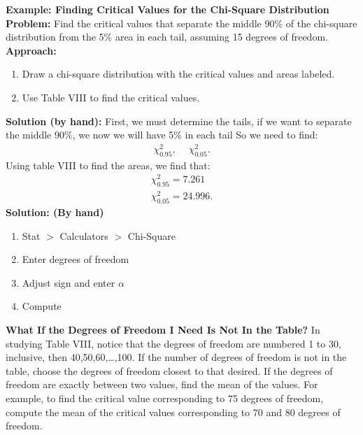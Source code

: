 \documentclass{report}
\begin{document}
    \pagebreak \bigbreak \noindent 
    \begin{mdframed}
      \textbf{Example: Finding Critical Values for the Chi-Square Distribution}
      \bigbreak \noindent 
      \textbf{Problem:}
      Find the critical values that separate the middle 90\% of the chi-square distribution from the 5\% area in each tail, assuming 15 degrees of freedom.
      \bigbreak \noindent 
      \textbf{Approach:}
      \begin{enumerate}
          \item Draw a chi-square distribution with the critical values and areas labeled.
            \item  Use Table VIII to find the critical values.
      \end{enumerate}
      \bigbreak \noindent 
      \textbf{Solution (by hand):}
      \bigbreak \noindent 
      First, we must determine the tails, if we want to separate the middle 90\%, we now we will have 5\% in each tail
      \bigbreak \noindent 
      So we need to find:
      \begin{align*}
          \chi^{2}_{0.95},\ \quad 
          \chi^{2}_{0.05}
      .\end{align*}
      \bigbreak \noindent 
      Using table VIII to find the areas, we find that:
      \begin{align*}
          \chi^{2}_{0.95} = 7.261  \\
          \chi^{2}_{0.05} = 24.996
      .\end{align*}
      \bigbreak \noindent 
      \textbf{Solution: (By hand)}
      \bigbreak \noindent 
      \begin{enumerate}
          \item Stat $> $ Calculators $> $ Chi-Square
          \item  Enter degrees of freedom
            \item Adjust sign and enter $\alpha$
            \item Compute
      \end{enumerate}
      
    \end{mdframed}
    \bigbreak \noindent 
    \textbf{What If the Degrees of Freedom I Need Is Not In the Table?}
    \bigbreak \noindent 
    In studying Table VIII, notice that the degrees of freedom are numbered 1 to 30, inclusive, then 40,50,60,…,100. If the number of degrees of freedom is not in the table, choose the degrees of freedom closest to that desired. If the degrees of freedom are exactly between two values, find the mean of the values.
    \bigbreak \noindent 
    For example, to find the critical value corresponding to 75 degrees of freedom, compute the mean of the critical values corresponding to 70 and 80 degrees of freedom.
\end{document}

